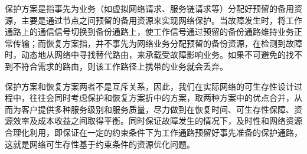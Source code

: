 
保护方案是指事先为业务（如虚拟网络请求、服务链请求等）分配好预留的备用资源，主要是通过节点之间预留的备用资源来实现网络保护。当故障发生时，将工作通路上的通信信号切换到备份通路上，使工作信号通过预留的备份通路维持业务正常传输；而恢复方案指，并不事先为网络业务分配预留的备份资源，在检测到故障时，动态地从网络中寻找替代路由，来承载受故障影响业务。如果不可避免的找不到不符合需求的路由，则该工作路径上携带的业务就会丢弃。



保护方案和恢复方案两者不是互斥关系，因此，我们在实际网络的可生存性设计过程中，往往会同时考虑保护和恢复方案折中的方案，取两种方案中的优点合并，从而为客户提供多种服务级别和服务质量，尽力做到在恢复时间、可生存性保障、资源效率及成本收益之间取得平衡。同时保证故障发生的情况下，及时性和网络资源合理化利用，即保证在一定的约束条件下为工作通路预留好事先准备的保护通路，这就是网络可生存性基于约束条件的资源优化问题。



